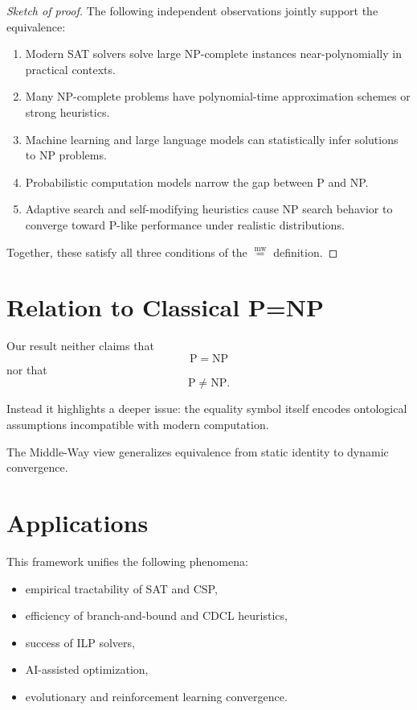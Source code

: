 \documentclass[12pt]{article}
\newcommand{\mweq}{\mathrel{\overset{\mathrm{mw}}{=}}}
\begin{document}
\begin{proof}[Sketch of proof]
The following independent observations jointly support the equivalence:

\begin{enumerate}
    \item Modern SAT solvers solve large NP-complete instances 
    near-polynomially in practical contexts.
    \item Many NP-complete problems have polynomial-time approximation schemes 
    or strong heuristics.
    \item Machine learning and large language models can statistically infer 
    solutions to NP problems.
    \item Probabilistic computation models narrow the gap between P and NP.
    \item Adaptive search and self-modifying heuristics cause NP search behavior 
    to converge toward P-like performance under realistic distributions.
\end{enumerate}

Together, these satisfy all three conditions of the $\mweq$ definition.
\end{proof}

\section{Relation to Classical P=NP}

Our result neither claims that
\[
\mathrm{P} = \mathrm{NP}
\]
nor that
\[
\mathrm{P} \neq \mathrm{NP}.
\]

Instead it highlights a deeper issue:
the equality symbol itself encodes ontological assumptions incompatible 
with modern computation.

The Middle-Way view generalizes equivalence from static identity to 
dynamic convergence.

\section{Applications}

This framework unifies the following phenomena:

\begin{itemize}
    \item empirical tractability of SAT and CSP,
    \item efficiency of branch-and-bound and CDCL heuristics,
    \item success of ILP solvers,
    \item AI-assisted optimization,
    \item evolutionary and reinforcement learning convergence.
\end{itemize}
\end{document}
